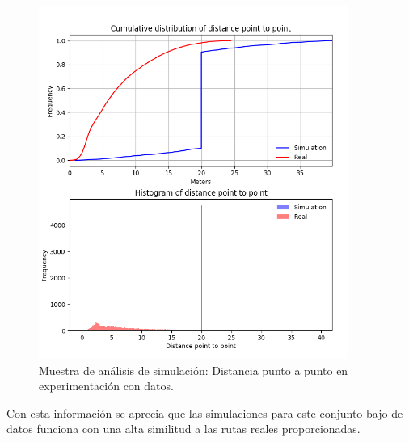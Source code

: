 \begin{figure}[!htb]
\begin{minipage}{0.48\textwidth}
\includegraphics[width=0.9\textwidth]{./Imagenes/SimulationComparativeEmpty.png}
\caption{Muestra de análisis de simulación: Distancia punto a punto en experimentación con datos.}
\label{figure:ComparativaEmpty}
\end{minipage}
\end{figure}

Con esta información se aprecia que las simulaciones para este conjunto bajo de datos funciona con una alta similitud a las rutas reales proporcionadas.